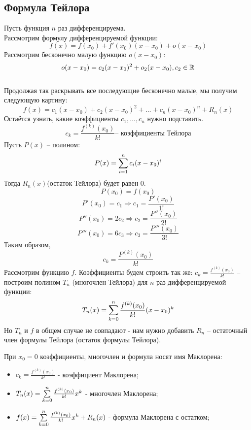 \subsection{Формула Тейлора}
Пусть функция \( n \) раз дифференцируема. \\
Рассмотрим формулу дифференцируемой функции:
\[ f(x) = f(x_0) + f'(x_0)(x-x_0) + o(x-x_0) \]
Рассмотрим бесконечно малую функцию \( o(x-x_0) \):
\[ o(x-x_0) = c_2(x-x_0)^2 + o_2(x-x_0), c_2 \in \mathbb{R} \]
 \\ 
Продолжая так раскрывать все последующие бесконечно малые, мы получим следующую картину:
\[ f(x) = c_1(x-x_0)+c_2(x-x_0)^2+\dots+c_n(x-x_0)^n+R_n(x) \]
Остаётся узнать, какие коэффициенты \( c_{1}, \dots, c_{n} \) нужно подставить. \\ 
\[ c_k = \frac{f^{(k)}(x_0)}{k!} \text{-- коэффициенты Тейлора} \]
Пусть \( P(x) \) -- полином: 
\[ P(x) = \sum \limits_{i=1}^{n} {c_i(x-x_0)^i} \]
Тогда \( R_n(x) \)(остаток Тейлора) будет равен \( 0 \).
\[ P(x_0) = f(x_0) \]
\[ P'(x_0) = c_1 \Longrightarrow c_1 = \frac{P'(x_0)}{1!} \]
\[ P''(x_0) = 2c_2 \Longrightarrow c_2 = \frac{P''(x_0)}{2!} \]
\[ P'''(x_0) = 6c_3 \Longrightarrow c_3 = \frac{P'''(x_0)}{3!} \]
Таким образом, \[ c_k = \frac{P^{(k)}(x_0)}{k!} \]
Рассмотрим функцию \( f \). Коэффициенты будем строить так же: \( c_k  = \frac{f^{(k)}(x_0)}{k!}\) -- построим полином \( T_n \) (многочлен Тейлора) для \( n \) раз дифференцируемой функции:
\[ T_n(x) = \sum \limits_{k=0}^{n} {\frac{f^{(k)}(x_0)}{k!}(x-x_0)^k} \]
Но \( T_n \) и \( f \) в общем случае не совпадают - нам нужно добавить \( R_n \) -- остаточный член формулы Тейлора (остаток формулы Тейлора).
\begin{note} 
    При \(x_0 = 0\) коэффициенты, многочлен и формула носят имя Маклорена:
    \begin{itemize} 
        \item \( c_k  = \frac{f^{(k)}(x_0)}{k!} \) - коэффициент Маклорена;
        \item \( T_n(x) = \sum \limits_{k=0}^{n} {\frac{f^{(k)}(x_0)}{k!}x^k} \) - многочлен Маклорена;
        \item \( f(x) = \sum \limits_{k=0}^{n} {\frac{f^{(k)}(x_0)}{k!}x^k + R_n(x)}\) - формула Маклорена с остатком;
    \end{itemize}
\end{note}